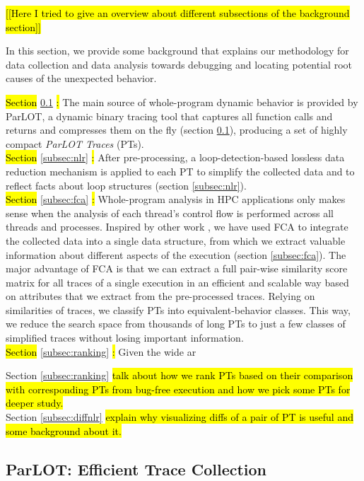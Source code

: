 
\hl{[[Here I tried to give an overview about different subsections of the background section]]}

In this section, we provide some background that explains our methodology for data collection and data analysis towards debugging and locating potential root causes of the unexpected behavior. 
%

\hl{Section} \ref{subsec:parlot} \hl{:}
The main source of whole-program dynamic behavior is provided by ParLOT, a dynamic binary tracing tool that captures all function calls and returns and compresses them on the fly (section \ref{subsec:parlot}), producing a set of highly compact \textit{ParLOT Traces} (PTs).
\\
%
\hl{Section} \ref{subsec:nlr} \hl{:}
After pre-processing, a loop-detection-based lossless data reduction mechanism is applied to each PT to simplify the collected data and to reflect facts about loop structures (section \ref{subsec:nlr}).
%
\\
\hl{Section} \ref{subsec:fca} \hl{:}
Whole-program analysis in HPC applications only makes sense when the analysis of each thread's control flow is performed across all threads and processes.
%
Inspired by other work \cite{weberStructural} \cite{Alqadah2011} \cite{Ignatov17} \cite{latticeForDistConst}, we have used FCA \cite{clbook} to integrate the collected data into a single data structure, from which we extract valuable information about different aspects of the execution (section \ref{subsec:fca}).
%
The major advantage of FCA is that we can extract a full pair-wise similarity score matrix for all traces of a single execution in an efficient and scalable way based on attributes that we extract from the pre-processed traces.
%
Relying on similarities of traces, we classify PTs into equivalent-behavior classes.
%
This way, we reduce the search space from thousands of long PTs to just a few classes of simplified traces without losing important information.
\\
\hl{Section} \ref{subsec:ranking} \hl{:}
Given the wide ar


Section \ref{subsec:ranking} \hl{ talk about how we rank PTs based on their comparison with corresponding PTs from bug-free execution and how we pick some PTs for deeper study.}
\\
Section \ref{subsec:diffnlr}\hl{ explain why visualizing diffs of a pair of PT is useful and some background about it.}




\subsection{ParLOT: Efficient Trace Collection}
\label{subsec:parlot}

